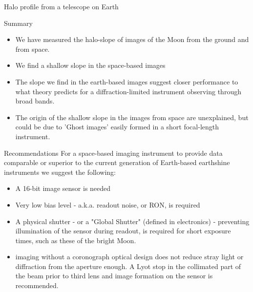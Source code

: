 \documentclass[final,hyperref={pdfpagelabels=false}]{beamer}
\begin{document}
\begin{frame}[t]
\begin{columns}[t]
\begin{column}{.23\textwidth}
\begin{block}{Halo profile from a telescope on Earth}
\end{block}
\begin{block}{Summary}
\begin{itemize}
    \item We have  measured the halo-slope of images of the Moon from the ground and from space.
    \item We find a shallow slope in the space-based images
    \item The slope we find in the earth-based images suggest closer performance to what theory predicts for a diffraction-limited instrument observing through broad bands.
    \item The origin of the shallow slope in the images from space are unexplained, but could be due to 'Ghost images' easily formed in a short focal-length instrument.
\end{itemize}

\end{block}

\begin{block}{Recommendations}
For a space-based imaging instrument to provide data comparable or superior to the current generation of Earth-based earthshine instruments we suggest the following:
\begin{itemize}
    \item A 16-bit image sensor is needed
    \item Very low bias level - a.k.a. readout noise, or RON, is required
    \item A physical shutter - or a "Global Shutter" (defined in electronics) - preventing illumination of the sensor during readout, is required for short exposure times, such as these of the bright Moon.
    \item imaging without a coronograph optical design does not reduce stray light or diffraction from the aperture enough. A Lyot stop in the collimated part of the beam prior to third lens and image formation on the sensor is recommended.
\end{itemize}



\end{block}
 





\end{column}
\end{columns}
\end{frame}
\end{document}
